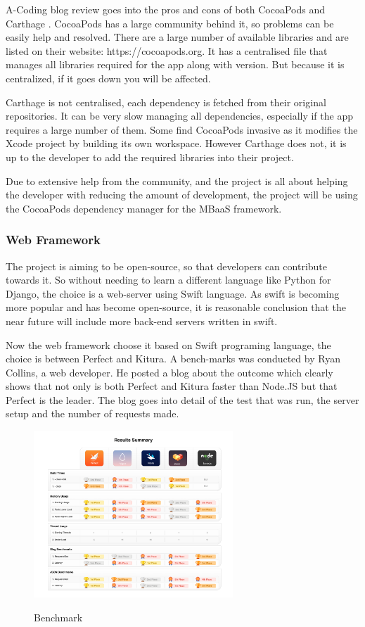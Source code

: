 A-Coding blog review goes into the pros and cons of both CocoaPods and Carthage \cite{acodingwebsite}. CocoaPods has a large community behind it, so problems can be easily help and resolved. There are a large number of available libraries and are listed on their website: https://cocoapods.org. It has a centralised file that manages all libraries required for the app along with version. But because it is centralized, if it goes down you will be affected.

Carthage is not centralised, each dependency is fetched from their original repositories. It can be very slow managing all dependencies, especially if the app requires a large number of them. Some find CocoaPods invasive as it modifies the Xcode project by building its own workspace. However Carthage does not, it is up to the developer to add the required libraries into their project.

Due to extensive help from the community, and the project is all about helping the developer with reducing the amount of development, the project will be using the CocoaPods dependency manager for the MBaaS framework.


\subsubsection{Web Framework}

The project is aiming to be open-source, so that developers can contribute towards it. So without needing to learn a different language like Python for Django, the choice is a web-server using Swift language. As swift is becoming more popular and has become open-source, it is reasonable conclusion that the near future will include more back-end servers written in swift.

Now the web framework choose it based on Swift programing language, the choice is between Perfect and Kitura. A bench-marks was conducted by Ryan Collins, a web developer. He posted a blog about the outcome \cite{benchmark} which clearly shows that not only is both Perfect and Kitura faster than Node.JS but that Perfect is the leader. The blog goes into detail of the test that was run, the server setup and the number of requests made.

\begin{figure}[!h]
    \caption{Benchmark}
    \centering
    \includegraphics[width=75mm]{images/benchmarks}
    \label{fig:label}
\end{figure}

